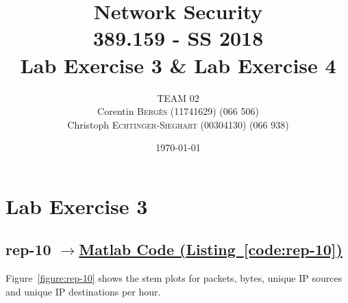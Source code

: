 \documentclass{article}
\title{Network Security \\ 389.159 - SS 2018 \\ Lab Exercise 3 \& Lab Exercise 4} %
\author{
    TEAM 02 \\
    Corentin \textsc{Bergès} (11741629) (066 506) \\
    Christoph \textsc{Echtinger-Sieghart} (00304130) (066 938)
}
\date{\today} %
\newcommand{\codelink}[1]{%
    \hyperref[#1]{\quad$\rightarrow$\enskip Matlab Code (Listing~\ref{#1})}%
}
\begin{document}
\maketitle %
\renewcommand{\arraystretch}{2} %


\section{Lab Exercise 3}

\subsection{rep-10 \codelink{code:rep-10}}

Figure~\ref{figure:rep-10} shows the stem plots for packets, bytes, unique IP sources and
unique IP destinations per hour.
\end{document}
